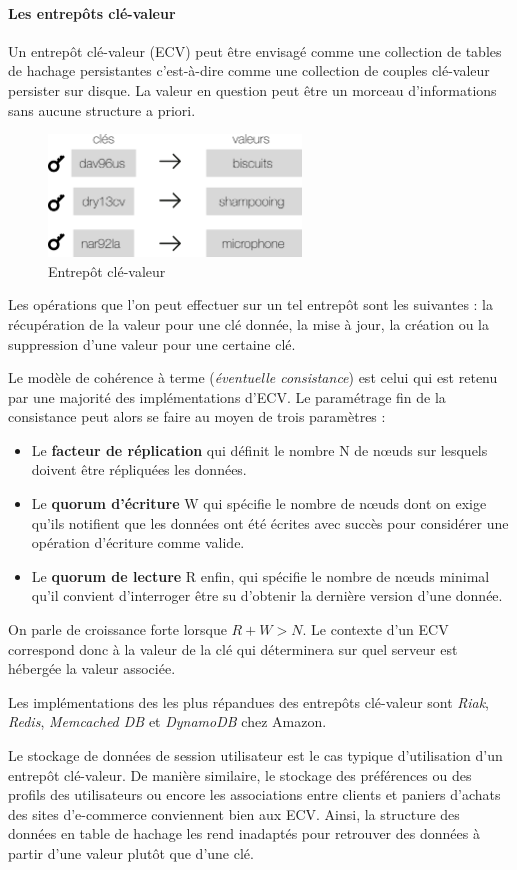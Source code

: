\documentclass[12pt]{article}
\begin{document}
\paragraph{Les entrepôts clé-valeur}
Un entrepôt clé-valeur (ECV) peut être envisagé comme une collection de tables de hachage persistantes c'est-à-dire comme une collection de couples clé-valeur persister sur disque. La valeur en question peut être un morceau d'informations sans aucune structure a priori. \begin{figure}[H]
\centering
\includegraphics[width=0.6\textwidth]{key}
\caption{Entrepôt clé-valeur}
\end{figure}
Les opérations que l'on peut effectuer sur un tel entrepôt sont les suivantes : la récupération de la valeur pour une clé donnée, la mise à jour, la création ou la suppression d'une valeur pour une certaine clé. \par
Le modèle de cohérence à terme (\emph{éventuelle consistance}) est celui qui est retenu par une majorité des implémentations d'ECV. Le paramétrage fin de la consistance peut alors se faire au moyen de trois paramètres : 
\begin{itemize}
\item Le \textbf{facteur de réplication} qui définit le nombre N de nœuds sur lesquels doivent être répliquées les données.
\item Le \textbf{quorum d'écriture} W qui spécifie le nombre de nœuds dont on exige qu'ils notifient que les données ont été écrites avec succès pour considérer une opération d'écriture comme valide.
\item Le \textbf{quorum de lecture }R enfin, qui spécifie le nombre de nœuds minimal qu'il convient d'interroger être su d'obtenir la dernière version d'une donnée.
\end{itemize}
\vspace{0.4cm}
On parle de croissance forte lorsque $R+W>N$. Le contexte d'un ECV correspond donc à la valeur de la clé qui déterminera sur quel serveur est hébergée la valeur associée.
\par
Les implémentations des les plus répandues des entrepôts  clé-valeur sont \emph{Riak}, \emph{Redis}, \emph{Memcached DB} et \emph{DynamoDB} chez Amazon.
\par
Le stockage de données de session utilisateur est le cas typique d'utilisation d'un entrepôt clé-valeur. De manière similaire, le stockage des préférences ou des profils des utilisateurs ou encore les associations entre clients et paniers d'achats des sites d'e-commerce conviennent bien aux ECV. Ainsi, la structure des données en table de hachage les rend inadaptés pour retrouver des données à partir d'une valeur plutôt que d'une clé.
\end{document}

